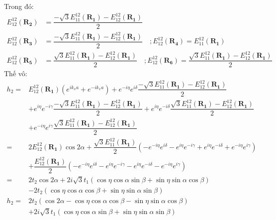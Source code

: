 \documentclass{report}
\begin{document}
\noindent Trong đó:
\begin{align*}
	E_{12}^{12}(\mathbf{R_2}) & = \dfrac{ - \sqrt{3}E_{11}^{12}(\mathbf{R_1}) - E_{12}^{12}(\mathbf{R_1})}{2}                                                                                                            \\
	E_{12}^{12}(\mathbf{R_3}) & = \dfrac{ - \sqrt{3}E_{11}^{12}(\mathbf{R_1}) - E_{12}^{12}(\mathbf{R_1})}{2} \quad ;  E_{12}^{12}(\mathbf{R_4}) = E_{11}^{12}(\mathbf{R_1})                                             \\
	E_{12}^{12}(\mathbf{R_5}) & = \dfrac{\sqrt{3}E_{11}^{12}(\mathbf{R_1}) - E_{12}^{12}(\mathbf{R_1})}{2} \quad ; E_{12}^{12}(\mathbf{R_6})  = \dfrac{\sqrt{3}E_{11}^{12}(\mathbf{R_1}) - E_{12}^{12}(\mathbf{R_1})}{2}
\end{align*}
Thế vô:
\begin{align*}
	h_2 = & E_{12}^{12}(\mathbf{R_1}) \left( e^{ik_x a} + e^{-ik_x a} \right) + e^{-i\eta} e^{i\delta} \dfrac{ - \sqrt{3}E_{11}^{12}(\mathbf{R_1}) - E_{12}^{12}(\mathbf{R_1})}{2}                                 \\
	      & + e^{i\eta} e^{-i\gamma} \dfrac{ - \sqrt{3}E_{11}^{12}(\mathbf{R_1}) - E_{12}^{12}(\mathbf{R_1})}{2} + e^{i\eta} e^{-i\delta} \dfrac{\sqrt{3}E_{11}^{12}(\mathbf{R_1}) - E_{12}^{12}(\mathbf{R_1})}{2} \\
	      & + e^{-i\eta} e^{i\gamma} \dfrac{\sqrt{3}E_{11}^{12}(\mathbf{R_1}) - E_{12}^{12}(\mathbf{R_1})}{2}                                                                                                      \\
	=     & 2 E_{12}^{12}(\mathbf{R_1}) \cos 2\alpha + \dfrac{\sqrt{3}E_{11}^{12}(\mathbf{R_1})}{2}\left( - e^{-i\eta}e^{i\delta} - e^{i\eta}e^{-i\gamma} + e^{i\eta}e^{-i\delta} + e^{-i\eta}e^{i\gamma} \right)  \\
	      & + \dfrac{E_{12}^{12}(\mathbf{R_1})}{2}\left( - e^{-i\eta}e^{i\delta} - e^{i\eta}e^{-i\gamma} - e^{i\eta}e^{-i\delta} - e^{-i\eta}e^{i\gamma} \right)                                                   \\
	=     & 2t_2 \cos 2\alpha + 2i\sqrt{3}t_1(\cos\eta\cos\alpha\sin\beta +  \sin\eta\sin\alpha\cos\beta)                                                                                                          \\
	      & - 2t_2 (\cos\eta\cos\alpha\cos\beta + \sin\eta\sin\alpha\sin\beta)                                                                                                                                     \\
	h_2 = & 2t_2 (\cos 2\alpha - \cos\eta\cos\alpha\cos\beta - \sin\eta\sin\alpha\cos\beta)     \nonumber                                                                                                          \\
	      & + 2i\sqrt{3}t_1(\cos\eta\cos\alpha\sin\beta +  \sin\eta\sin\alpha\sin\beta)
\end{align*}
\end{document}

